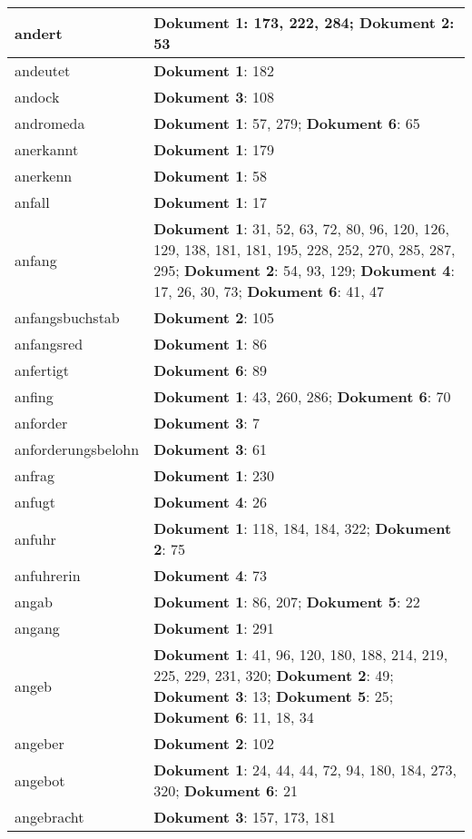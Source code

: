 \documentclass[a5paper]{article}
\begin{document}
\begin{longtable}[l]{|l|p{3in}|}
\hline
andert & \textbf{Dokument 1}: 173, 222, 284; \textbf{Dokument 2}: 53 \\
\hline
andeutet & \textbf{Dokument 1}: 182 \\
\hline
andock & \textbf{Dokument 3}: 108 \\
\hline
andromeda & \textbf{Dokument 1}: 57, 279; \textbf{Dokument 6}: 65 \\
\hline
anerkannt & \textbf{Dokument 1}: 179 \\
\hline
anerkenn & \textbf{Dokument 1}: 58 \\
\hline
anfall & \textbf{Dokument 1}: 17 \\
\hline
anfang & \textbf{Dokument 1}: 31, 52, 63, 72, 80, 96, 120, 126, 129, 138, 181, 181, 195, 228, 252, 270, 285, 287, 295; \textbf{Dokument 2}: 54, 93, 129; \textbf{Dokument 4}: 17, 26, 30, 73; \textbf{Dokument 6}: 41, 47 \\
\hline
anfangsbuchstab & \textbf{Dokument 2}: 105 \\
\hline
anfangsred & \textbf{Dokument 1}: 86 \\
\hline
anfertigt & \textbf{Dokument 6}: 89 \\
\hline
anfing & \textbf{Dokument 1}: 43, 260, 286; \textbf{Dokument 6}: 70 \\
\hline
anforder & \textbf{Dokument 3}: 7 \\
\hline
anforderungsbelohn & \textbf{Dokument 3}: 61 \\
\hline
anfrag & \textbf{Dokument 1}: 230 \\
\hline
anfugt & \textbf{Dokument 4}: 26 \\
\hline
anfuhr & \textbf{Dokument 1}: 118, 184, 184, 322; \textbf{Dokument 2}: 75 \\
\hline
anfuhrerin & \textbf{Dokument 4}: 73 \\
\hline
angab & \textbf{Dokument 1}: 86, 207; \textbf{Dokument 5}: 22 \\
\hline
angang & \textbf{Dokument 1}: 291 \\
\hline
angeb & \textbf{Dokument 1}: 41, 96, 120, 180, 188, 214, 219, 225, 229, 231, 320; \textbf{Dokument 2}: 49; \textbf{Dokument 3}: 13; \textbf{Dokument 5}: 25; \textbf{Dokument 6}: 11, 18, 34 \\
\hline
angeber & \textbf{Dokument 2}: 102 \\
\hline
angebot & \textbf{Dokument 1}: 24, 44, 44, 72, 94, 180, 184, 273, 320; \textbf{Dokument 6}: 21 \\
\hline
angebracht & \textbf{Dokument 3}: 157, 173, 181 \\

\end{longtable}
\end{document}
